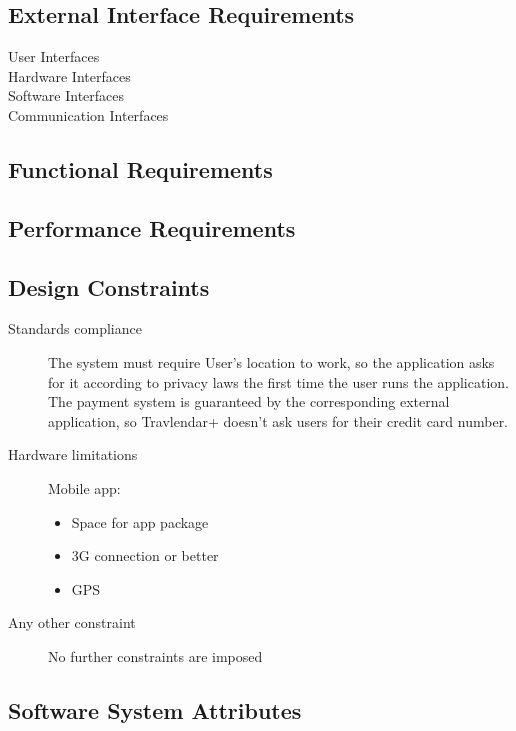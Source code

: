 \subsection{External Interface Requirements}
				\begin{description}
					\item[User Interfaces]
					\item[Hardware Interfaces]
					\item[Software Interfaces]
					\item[Communication Interfaces]
				\end{description}

\subsection{Functional Requirements}
	
			
\subsection{Performance Requirements}
		
		
\subsection{Design Constraints}
		\begin{description}
			\item[Standards compliance]
			The system must require User’s location to work, so the application asks for it according to privacy laws the first time the user runs the application.
			The payment system is guaranteed by the corresponding external application, so Travlendar+ doesn’t ask users for their credit card number.

			\item[Hardware limitations]
			Mobile app:
			\begin{itemize}
			\item Space for app package
			\item 3G connection or better
			\item GPS
		\end{itemize}

			\item[Any other constraint]
			No further constraints are imposed
\end{description}
		
\subsection{Software System Attributes}
	
